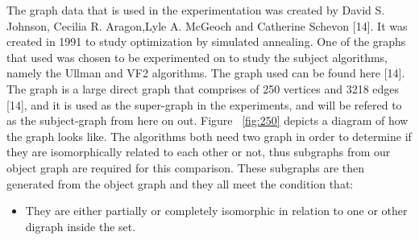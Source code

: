 \label{Data Set}

The graph data that is used in the experimentation was created by David S. Johnson, Cecilia R. Aragon,Lyle A. McGeoch and Catherine Schevon [14]. 
It was created in 1991 to study optimization by simulated annealing. One of the graphs that used was chosen to be experimented on to study the subject
algorithms, namely the Ullman and VF2 algorithms. The graph used can be found here [14].\newline\newline
The graph is a large direct graph that comprises of 250 vertices and 3218 edges [14], and it is used as the super-graph in the experiments, 
and will be refered to as the subject-graph from here on out. Figure ~\ref{fig:250} depicts a diagram of how the graph looks like.\newline\newline
The algorithms both need two graph in order to determine if they are isomorphically related to each other or not, thus subgraphs from our object graph
are required for this comparison. These subgraphs are then generated from the object graph and they all meet the condition that:
\begin{itemize}
  \item They are either partially or completely isomorphic in relation to one or other digraph inside the set.
\end{itemize}

